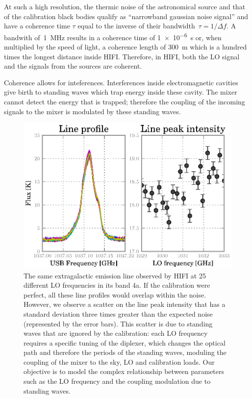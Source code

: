 \documentclass[a4paper,11pt]{article}
\begin{document}
At such a high resolution, the thermic noise of the astronomical source and that of the calibration black bodies qualify as ``narrowband gaussian noise signal'' \cite{siegman1986lasers} and have a coherence time $\tau$ equal to the inverse of their bandwidth~$\tau=1/\Delta f$.
A bandwith of~\SI{1}{\mega\hertz} results in a coherence time of \SI{1e-6}{\second} or, when multiplied by the speed of light, a coherence length of \SI{300}{\meter} which is a hundred times the longest distance inside HIFI.
Therefore, in HIFI, both the LO signal and the signals from the sources are coherent.

Coherence allows for inteferences.
Interferences inside electromagnetic cavities give birth to standing waves which trap energy inside these cavity.
The mixer cannot detect the energy that is trapped; 
therefore the coupling of the incoming signals to the mixer is modulated by these standing waves.

\begin{figure}[hbt]
    \centering
    \includegraphics[width=\textwidth]{obsid_5000352C}
    \caption{\label{fig:scatter_real_data}
    The same extragalactic emission line observed by HIFI at 25 different LO frequencies in its band 4a.
    If the calibration were perfect, all these line profiles would overlap within the noise.
    However, we observe a scatter on the line peak intensity that has a standard deviation three times greater than the expected noise (represented by the error bars).
    This scatter is due to standing waves that are ignored by the calibration: each LO frequency requires a specific tuning of the diplexer, which changes the optical path and therefore the periods of the standing waves, moduling the coupling of the mixer to the sky, LO and calibration loads.
    Our objective is to model the complex relationship between parameters such as the LO frequency and the coupling modulation due to standing waves.
    }
\end{figure}
\end{document}
